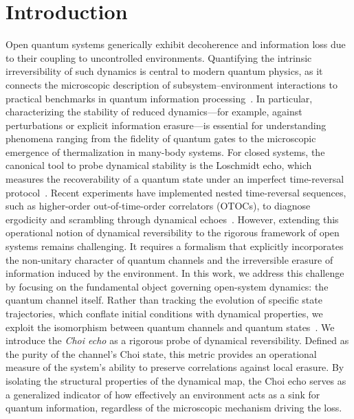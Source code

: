\documentclass[pra,twocolumn,aps,showpacs,superscriptaddress,longbibliography]{revtex4-2}
\begin{document}
\section{Introduction}
Open quantum systems generically exhibit decoherence and information loss due to their coupling to uncontrolled environments. Quantifying the intrinsic irreversibility of such dynamics is central to modern quantum physics, as it connects the microscopic description of subsystem--environment interactions to practical benchmarks in quantum information processing~\cite{nielsen_2010_quantum, breuer_2002_theory}. In particular, characterizing the stability of reduced dynamics---for example, against perturbations or explicit information erasure---is essential for understanding phenomena ranging from the fidelity of quantum gates to the microscopic emergence of thermalization in many-body systems.
For closed systems, the canonical tool to probe dynamical stability is the Loschmidt echo, which measures the recoverability of a quantum state under an imperfect time-reversal protocol~\cite{peres_1984_stability, gorin_2006_dynamics}. Recent experiments have implemented nested time-reversal sequences, such as higher-order out-of-time-order correlators (OTOCs), to diagnose ergodicity and scrambling through dynamical echoes~\cite{googleecho2025}. However, extending this operational notion of dynamical reversibility to the rigorous framework of open systems remains challenging. It requires a formalism that explicitly incorporates the non-unitary character of quantum channels and the irreversible erasure of information induced by the environment.
In this work, we address this challenge by focusing on the fundamental object governing open-system dynamics: the quantum channel itself. Rather than tracking the evolution of specific state trajectories, which conflate initial conditions with dynamical properties, we exploit the isomorphism between quantum channels and quantum states~\cite{jamiolkowski_1972_linear, choi_1975_completely}. We introduce the \textit{Choi echo} as a rigorous probe of dynamical reversibility. Defined as the purity of the channel's Choi state, this metric provides an operational measure of the system's ability to preserve correlations against local erasure. By isolating the structural properties of the dynamical map, the Choi echo serves as a generalized indicator of how effectively an environment acts as a sink for quantum information, regardless of the microscopic mechanism driving the loss.
\end{document}
